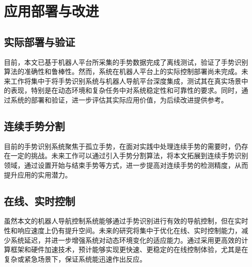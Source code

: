 

\section{应用部署与改进}
\subsection{实际部署与验证}
目前，本文已基于机器人平台所采集的手势数据完成了离线测试，验证了手势识别算法的准确性和鲁棒性。然而，系统在机器人平台上的实际控制部署尚未完成。未来工作将集中于将手势识别系统与机器人导航平台深度集成，测试其在真实场景中的表现，特别是在动态环境和复杂任务中对系统稳定性和可靠性的要求。同时，通过系统的部署和验证，进一步评估其实际应用价值，为后续改进提供参考。
\subsection{连续手势分割}
目前的手势识别系统聚焦于孤立手势，在面对实践中处理连续手势的需要时，仍存在一定的挑战。未来工作可以通过引入手势分割算法，将本文拓展到连续手势识别领域，通过设置开始与结束手势等方式，进一步提高对连续手势的检测精度，从而提升应用的实用潜力。
\subsection{在线、实时控制}
虽然本文的机器人导航控制系统能够通过手势识别进行有效的导航控制，但在实时性和响应速度上仍有提升空间。未来的研究将集中于优化在线、实时控制能力，减少系统延迟，并进一步增强系统对动态环境变化的适应能力。通过采用更高效的计算框架和硬件加速技术，预计能够实现更快速、更稳定的在线控制体验，尤其是在复杂或紧急场景下，保证系统能迅速作出反应。

